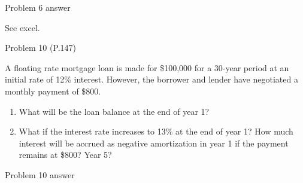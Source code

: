 \documentclass[ignorenonframetext,]{beamer}
\newenvironment{Shaded}{\begin{snugshade}}{\end{snugshade}}
\newcommand{\KeywordTok}[1]{\textcolor[rgb]{0.13,0.29,0.53}{\textbf{{#1}}}}
\newcommand{\DecValTok}[1]{\textcolor[rgb]{0.00,0.00,0.81}{{#1}}}
\newcommand{\FloatTok}[1]{\textcolor[rgb]{0.00,0.00,0.81}{{#1}}}
\newcommand{\StringTok}[1]{\textcolor[rgb]{0.31,0.60,0.02}{{#1}}}
\newcommand{\CommentTok}[1]{\textcolor[rgb]{0.56,0.35,0.01}{\textit{{#1}}}}
\newcommand{\NormalTok}[1]{{#1}}
\providecommand{\tightlist}{%
\setlength{\itemsep}{0pt}\setlength{\parskip}{0pt}}
\begin{document}
\begin{frame}[fragile]{Problem 6 answer}

\begin{Shaded}
\begin{Highlighting}[]
\NormalTok{See excel.}
\end{Highlighting}
\end{Shaded}

\normalsize

\end{frame}

\begin{frame}{Problem 10 (P.147)}

\small

A floating rate mortgage loan is made for \$100,000 for a 30-year period
at an initial rate of 12\% interest. However, the borrower and lender
have negotiated a monthly payment of \$800.

\begin{enumerate}
\def\labelenumi{\alph{enumi}.}
\tightlist
\item
  What will be the loan balance at the end of year 1?
\item
  What if the interest rate increases to 13\% at the end of year 1? How
  much interest will be accrued as negative amortization in year 1 if
  the payment remains at \$800? Year 5?
\end{enumerate}

\end{frame}

\begin{frame}[fragile]{Problem 10 answer}

\begin{Shaded}
\end{Shaded}

\normalsize

\end{frame}
\end{document}
